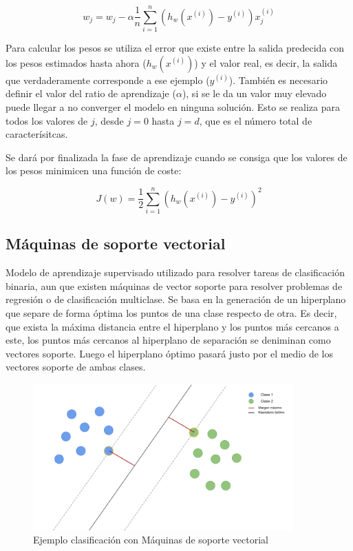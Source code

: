 \documentclass[a4paper, 12pt]{book}
\begin{document}
\begin{equation}
    w_j = w_j - \alpha \frac{1}{n} \sum_{i= 1}^{n} (h_w(x^{(i)}) - y^{(i)}) x_j^{(i)}
\end{equation}

Para calcular los pesos se utiliza el error que existe entre la salida predecida con los pesos estimados hasta ahora ($h_w(x^{(i)})$) y el valor real, es decir, la salida que verdaderamente corresponde a ese ejemplo ($y^{(i)}$). También es necesario definir el valor del ratio de aprendizaje ($\alpha$), si se le da un valor muy elevado puede llegar a no converger el modelo en ninguna solución. Esto se realiza para todos los valores de $j$, desde $j= 0$ hasta $j= d$, que es el número total de caracterísitcas.

Se dará por finalizada la fase de aprendizaje cuando se consiga que los valores de los pesos minimicen una función de coste:

\begin{equation}
    J(w) = \frac{1}{2} \sum_{i= 1}^{n} {(h_w(x^{(i)}) - y^{(i)})}^2 
\end{equation}


\subsection{Máquinas de soporte vectorial}
\label{subsec:maquitas_soporte_vectorial}

Modelo de aprendizaje supervisado utilizado para resolver tareas de clasificación binaria, aun que existen máquinas de vector soporte para resolver problemas de regresión o de clasificación multiclase. Se basa en la generación de un hiperplano que separe de forma óptima los puntos de una clase respecto de otra. Es decir, que exista la máxima distancia entre el hiperplano y los puntos más cercanos a este, los puntos más cercanos al hiperplano de separación se deniminan como vectores soporte. Luego el hiperplano óptimo pasará justo por el medio de los vectores soporte de ambas clases.

\begin{figure}[]
  \centering
  \includegraphics[width=10cm, keepaspectratio]{img/explicacion_svm.png}
  \caption{Ejemplo clasificación con Máquinas de soporte vectorial}\label{fig:explicacion_svm}
\end{figure}
\end{document}
